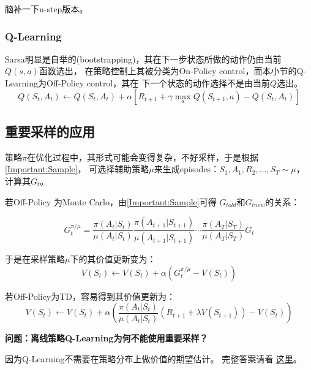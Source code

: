 \documentclass[UTF8]{ctexart}
\begin{document}
脑补一下n-step版本。

\subsubsection{Q-Learning}
Sarsa明显是自举的(bootstrapping)，其在下一步状态所做的动作仍由当前$Q(s,a)$函数选出，
在策略控制上其被分类为On-Policy control，而本小节的Q-Learning为Off-Policy control，其在
下一个状态的动作选择不是由当前$Q$选出。
\begin{equation}\label{qlearning}
    Q\left(S_{t}, A_{t}\right) \leftarrow Q\left(S_{t}, A_{t}\right)+\alpha\left[R_{t+1}+\gamma \max _{a} Q\left(S_{t+1}, a\right)-Q\left(S_{t}, A_{t}\right)\right]
\end{equation}

\subsection{重要采样的应用}
策略$\pi$在优化过程中，其形式可能会变得复杂，不好采样，于是根据\eqref{Important:Sample}，
可选择辅助策略$\mu$来生成episodes：$S_{1}, A_{1}, R_{2}, \dots, S_{T} \sim \mu$，
计算其$G_t$。

若Off-Policy 为Monte Carlo，由\eqref{Important:Sample}可得 $G_{told}$和$G_{tnew}$的关系：

$$G_{t}^{\pi / \mu}=\frac{\pi\left(A_{t} | S_{t}\right)}{\mu\left(A_{t} | S_{t}\right)} \frac{\pi\left(A_{t+1} | S_{t+1}\right)}{\mu\left(A_{t+1} | S_{t+1}\right)} \cdots
 \frac{\pi\left(A_{T} | S_{T}\right)}{\mu\left(A_{T} | S_{T}\right)} G_{t}$$

于是在采样策略$\mu$下的其价值更新变为：
$$V\left(S_{t}\right) \leftarrow V\left(S_{t}\right)+\alpha\left(G_{t}^{\pi / \mu}-V\left(S_{t}\right)\right)$$

若Off-Policy为TD，容易得到其价值更新为：
\begin{equation}
    V\left(S_{t}\right) \leftarrow V\left(S_{t}\right)+\alpha\left(\frac{\pi\left(A_{t} | S_{t}\right)}{\mu\left(A_{t} | S_{t}\right)}\left(R_{t+1}+
\lambda V\left(S_{t+1}\right)\right)-V\left(S_{t}\right)\right)
\end{equation}


\textbf{问题：离线策略Q-Learning为何不能使用重要采样？}

因为Q-Learning不需要在策略分布上做价值的期望估计。
完整答案请看
\href{https://www.quora.com/Why-doesn-t-DQN-use-importance-sampling-Dont-we-always-use-this-method-to-correct-the-sampling-error-produced-by-the-off-policy}{这里}。
\end{document}
